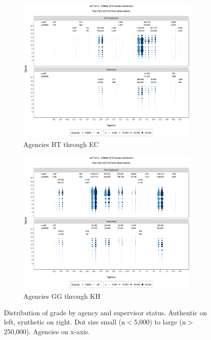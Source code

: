 \documentclass[10pt, letterpaper]{article}
\begin{document}
\begin{spacing}{1.0}
\clearpage

\begin{figure}[]
    \centering
    \begin{subfigure}{1\textwidth}
        \centering
        \includegraphics[width=6in, trim={0 200px 0 165px}, clip]{JdFDIBBSGSFullTimeGradeSupervisoryStatusAgency21.png}
        \caption{Agencies BT through EC}
        \vspace{20pt}
    \end{subfigure}
    \begin{subfigure}{1\textwidth}
        \centering
        \includegraphics[width=6in, trim={0 200px 0 165px}, clip]{JdFDIBBSGSFullTimeGradeSupervisoryStatusAgency61.png}
        \caption{Agencies GG through KH}
        \vspace{10pt}
    \end{subfigure}
    \caption{Distribution of grade by agency and supervisor status.  Authentic on left, synthetic on right.  Dot size small (n$<$5,000) to large (n$>$250,000).  Agencies on x-axis.}
    \label{figure:JdFDIBBSGSFullTimeGradeSupervisoryStatusAgency}
\end{figure}


\end{spacing}
\end{document}
